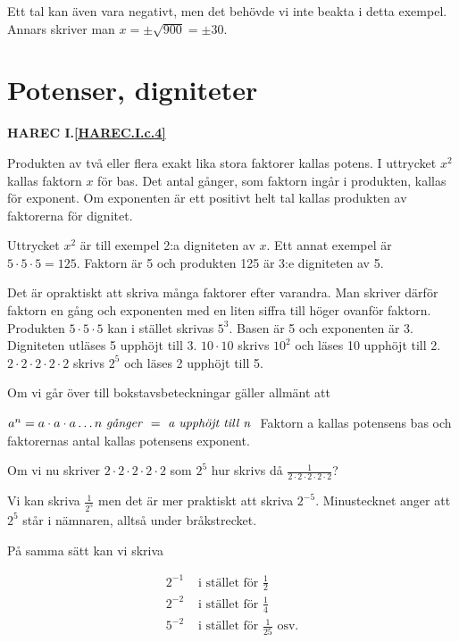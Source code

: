 Ett tal kan även vara negativt, men det behövde vi inte beakta i detta exempel.
Annars skriver man \(x = \pm \sqrt{900} = \pm 30\).

\section{Potenser, digniteter}
\textbf{HAREC I.\ref{HAREC.I.c.4}\label{myHAREC.I.c.4}}
\label{potenser}

Produkten av två eller flera exakt lika stora faktorer kallas potens.
I uttrycket \(x^2\) kallas faktorn \(x\) för bas. Det antal gånger, som faktorn
ingår i produkten, kallas för exponent.
Om exponenten är ett positivt helt tal kallas produkten av faktorerna för
dignitet.

Uttrycket \(x^2\) är till exempel 2:a digniteten av \(x\).
Ett annat exempel är \(5 \cdot 5 \cdot 5 = 125\).
Faktorn är 5 och produkten 125 är 3:e digniteten av 5.

Det är opraktiskt att skriva många faktorer efter varandra.
Man skriver därför faktorn en gång och exponenten med en liten siffra till
höger ovanför faktorn.
Produkten \(5 \cdot 5 \cdot 5\) kan i stället skrivas \(5^3\).
Basen är 5 och exponenten är 3.
Digniteten utläses 5 upphöjt till 3.
\(10 \cdot 10\) skrivs \(10^2\) och läses 10 upphöjt till 2.
\(2 \cdot 2 \cdot 2 \cdot 2 \cdot 2\) skrivs \(2^5\) och läses 2 upphöjt till 5.

Om vi går över till bokstavsbeteckningar gäller allmänt att

\(a^n= a \cdot a \cdot a \ldots n \textrm{ \emph{g{\aa}nger} } = \textrm{ \emph{a
  upphöjt till n} }\) 
Faktorn a kallas potensens bas och faktorernas antal kallas potensens exponent.

Om vi nu skriver \(2 \cdot 2 \cdot 2 \cdot 2 \cdot 2\) som \(2^5\) hur skrivs då
\(\frac{1}{2 \cdot 2 \cdot 2 \cdot 2 \cdot 2}\)?

Vi kan skriva \(\frac{1}{2^5}\) men det är mer praktiskt att skriva \(2^{-5}\).
Minustecknet anger att \(2^5\) står i nämnaren, alltså under bråkstrecket.

På samma sätt kan vi skriva

\begin{align*}
2^{-1} & \text{ i stället för } \frac{1}{2} \\
2^{-2} & \text{ i stället för } \frac{1}{4} \\
5^{-2} & \text{ i stället för } \frac{1}{25} \text{ osv.}
\end{align*}


